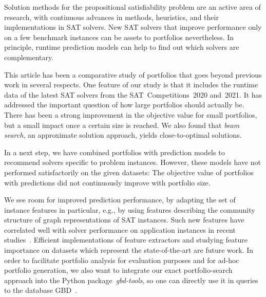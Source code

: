 \documentclass[runningheads]{llncs}
\begin{document}
Solution methods for the propositional satisfiability problem are an active area of research, with continuous advances in methods, heuristics, and their implementations in SAT solvers. 
New SAT solvers that improve performance only on a few benchmark instances can be assets to portfolios nevertheless. 
In principle, runtime prediction models can help to find out which solvers are complementary. 

This article has been a comparative study of portfolios that goes beyond previous work in several respects.
One feature of our study is that it includes the runtime data of the latest SAT solvers from the SAT~Competitions~2020 and~2021. 
It has addressed the important question of how large portfolios should actually be.
There has been a strong improvement in the objective value for small portfolios, but a small impact once a certain size is reached. 
We also found that \emph{beam search}, an approximate solution approach, yields close-to-optimal solutions.

In a next step, we have combined portfolios with prediction models to recommend solvers specific to problem instances.
However, these models have not performed satisfactorily on the given datasets:
The objective value of portfolios with predictions did not continuously improve with portfolio size.

We see room for improved prediction performance, by adapting the set of instance features in particular,
e.g., by using features describing the community structure of graph representations of SAT instances.
Such new features have correlated well with solver performance on application instances in recent studies~\cite{Ansotegui:2017:StructureFeatures,Li:2021:HCS}. 
Efficient implementations of feature extractors and studying feature importance on datasets which represent the state-of-the-art are future work. 
In order to facilitate portfolio analysis for evaluation purposes and for ad-hoc portfolio generation, we also want to integrate our exact portfolio-search approach into the Python package~\emph{gbd-tools}, so one can directly use it in queries to the database GBD~\cite{iser2020collaborative}. 



\end{document}
